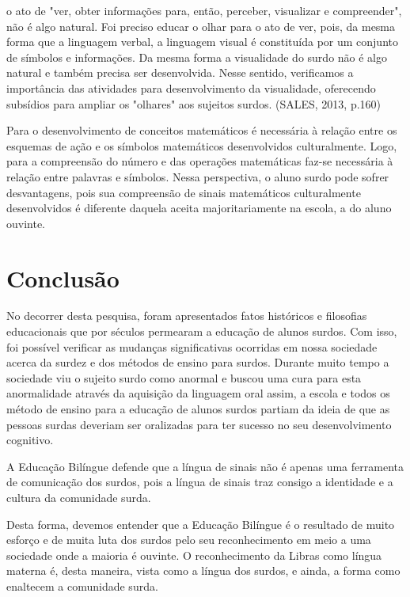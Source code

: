 \documentclass[brasil]{abnt}
\begin{document}
			\begin{citacao} [...] o ato de "ver, obter informações para, então, perceber, visualizar e compreender", não é algo natural. Foi preciso educar o olhar para o ato de ver, pois, da mesma forma que a linguagem verbal, 
							a linguagem visual é constituída por um conjunto de símbolos e informações. Da mesma forma a visualidade do surdo não é algo natural e também precisa ser desenvolvida. Nesse sentido, verificamos
							a importância das atividades para desenvolvimento da visualidade, oferecendo subsídios para ampliar os "olhares" aos sujeitos surdos. (SALES, 2013, p.160) 
			\end{citacao}
	
	Para o desenvolvimento de conceitos matemáticos é necessária à relação entre os esquemas de ação e os símbolos matemáticos desenvolvidos culturalmente. Logo, para a compreensão do número e das operações 
	matemáticas faz-se necessária à relação entre palavras e símbolos. Nessa perspectiva, o aluno surdo pode sofrer desvantagens, pois sua compreensão de sinais matemáticos culturalmente desenvolvidos é 
	diferente daquela aceita majoritariamente na escola, a do aluno ouvinte.

\chapter*{Conclusão}  

	No decorrer desta pesquisa, foram apresentados fatos históricos e filosofias educacionais que por séculos permearam a educação de alunos surdos. Com isso, foi possível verificar as mudanças
	significativas ocorridas em nossa sociedade acerca da surdez e dos métodos de ensino para surdos. Durante muito tempo a sociedade viu o sujeito surdo como anormal e buscou uma cura para esta anormalidade
	através da aquisição da linguagem oral assim, a escola e todos os método de ensino para a educação de alunos surdos partiam da ideia de que as pessoas surdas deveriam ser oralizadas para ter sucesso no seu 
	desenvolvimento cognitivo.  

	A Educação Bilíngue defende que a língua de sinais não é apenas uma ferramenta de comunicação dos surdos, pois a língua de sinais traz consigo a identidade e a cultura da comunidade surda. 
	
	Desta forma, devemos entender que a Educação Bilíngue é o resultado de muito esforço e de muita luta dos surdos pelo seu reconhecimento em meio a uma sociedade onde a maioria é ouvinte. O reconhecimento da
	Libras como língua materna é, desta maneira, vista como a língua dos surdos, e ainda, a forma como enaltecem a comunidade surda. 
	
\end{document}
